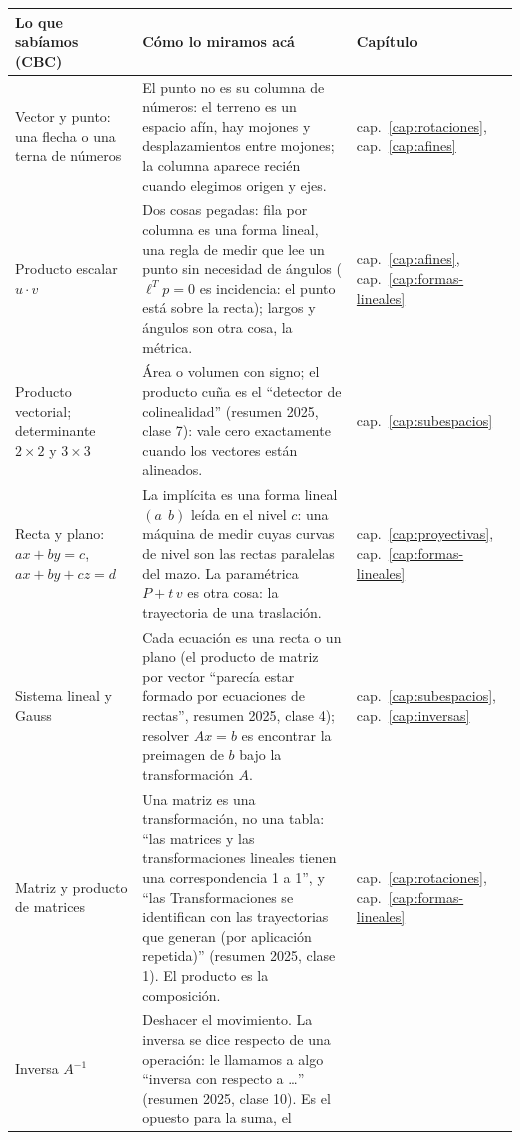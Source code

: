 {\small
\begin{tabularx}{\textwidth}{>{\raggedright\arraybackslash}p{30mm} Y >{\raggedright\arraybackslash}p{17mm}}
\toprule
\textbf{Lo que sabíamos (CBC)} & \textbf{Cómo lo miramos acá} & \textbf{Capítulo}\\
\midrule
Vector y punto: una flecha o una terna de números &
El punto no es su columna de números: el terreno es un espacio afín, hay mojones y
desplazamientos entre mojones; la columna aparece recién cuando elegimos origen y ejes. &
cap.~\ref{cap:rotaciones}, cap.~\ref{cap:afines}\\
Producto escalar \(u\cdot v\) &
Dos cosas pegadas: fila por columna es una forma lineal, una regla de medir que lee un
punto sin necesidad de ángulos (\(\ell^Tp=0\) es incidencia: el punto está sobre la
recta); largos y ángulos son otra cosa, la métrica. &
cap.~\ref{cap:afines}, cap.~\ref{cap:formas-lineales}\\
Producto vectorial; determinante \(2\times2\) y \(3\times3\) &
Área o volumen con signo; el producto cuña es el ``detector de colinealidad'' (resumen
2025, clase 7): vale cero exactamente cuando los vectores están alineados. &
cap.~\ref{cap:subespacios}\\
Recta y plano: \(ax+by=c\), \(ax+by+cz=d\) &
La implícita es una forma lineal \((a\ \ b)\) leída en el nivel \(c\): una máquina de medir
cuyas curvas de nivel son las rectas paralelas del mazo. La paramétrica \(P+t\,v\) es otra
cosa: la trayectoria de una traslación. &
cap.~\ref{cap:proyectivas}, cap.~\ref{cap:formas-lineales}\\
Sistema lineal y Gauss &
Cada ecuación es una recta o un plano (el producto de matriz por vector ``parecía estar
formado por ecuaciones de rectas'', resumen 2025, clase 4); resolver \(Ax=b\) es encontrar
la preimagen de \(b\) bajo la transformación \(A\). &
cap.~\ref{cap:subespacios}, cap.~\ref{cap:inversas}\\
Matriz y producto de matrices &
Una matriz es una transformación, no una tabla: ``las matrices y las transformaciones
lineales tienen una correspondencia 1 a 1'', y ``las Transformaciones se identifican con
las trayectorias que generan (por aplicación repetida)'' (resumen 2025, clase 1). El
producto es la composición. &
cap.~\ref{cap:rotaciones}, cap.~\ref{cap:formas-lineales}\\
Inversa \(A^{-1}\) &
Deshacer el movimiento. La inversa se dice respecto de una operación: le llamamos a algo
``inversa con respecto a \ldots'' (resumen 2025, clase 10). Es el opuesto para la suma, el

\end{tabularx}}
